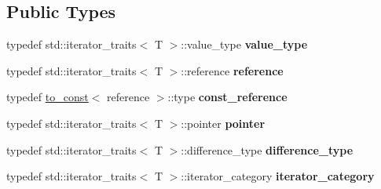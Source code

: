 \subsection*{Public Types}
\begin{DoxyCompactItemize}
\item 
\mbox{\label{structcugar_1_1block__strided__iterator_a912900e87149532f30eabc2322d51de7}} 
typedef std\+::iterator\+\_\+traits$<$ T $>$\+::value\+\_\+type {\bfseries value\+\_\+type}
\item 
\mbox{\label{structcugar_1_1block__strided__iterator_ad3ada3a12cba053f250755e0fcd31642}} 
typedef std\+::iterator\+\_\+traits$<$ T $>$\+::reference {\bfseries reference}
\item 
\mbox{\label{structcugar_1_1block__strided__iterator_ad0f3a015ff5aaa53081e2260fbeb4555}} 
typedef \hyperlink{structcugar_1_1to__const}{to\+\_\+const}$<$ reference $>$\+::type {\bfseries const\+\_\+reference}
\item 
\mbox{\label{structcugar_1_1block__strided__iterator_af4febe450b215485a6e4c7bf36b827df}} 
typedef std\+::iterator\+\_\+traits$<$ T $>$\+::pointer {\bfseries pointer}
\item 
\mbox{\label{structcugar_1_1block__strided__iterator_ad78325786c69c11eea9bbc6f1916f44e}} 
typedef std\+::iterator\+\_\+traits$<$ T $>$\+::difference\+\_\+type {\bfseries difference\+\_\+type}
\item 
\mbox{\label{structcugar_1_1block__strided__iterator_a337495c73e98c8253cfcec463fcf3ca8}} 
typedef std\+::iterator\+\_\+traits$<$ T $>$\+::iterator\+\_\+category {\bfseries iterator\+\_\+category}
\end{DoxyCompactItemize}
